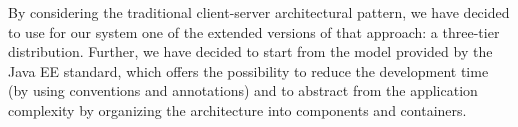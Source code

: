 By considering the traditional client-server architectural pattern, we have decided to use for our system one of the extended versions of that approach: a three-tier distribution.
\newline
Further, we have decided to start from the model provided by the Java EE standard, which offers the possibility to reduce the development time (by using conventions and annotations) and to abstract from the application complexity by organizing the architecture into components and containers.